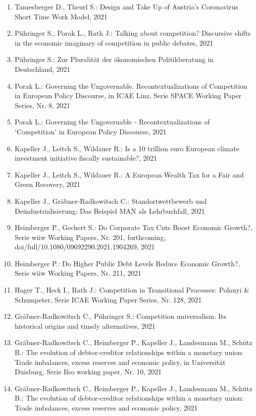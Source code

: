 \begin{enumerate}
    	 \item Tamesberger D., Theurl S.: Design and Take Up of Austria’s Coronavirus Short Time Work Model, 2021
	 \item Pühringer S., Porak L., Rath J.: Talking about competition? Discursive shifts in the economic imaginary of competition in public debates, 2021
	 \item Pühringer S.: Zur Pluralität der ökonomischen Politikberatung in Deutschland, 2021
	 \item Porak L.: Governing the Ungovernable. Recontextualizations of Competition in European Policy Discourse, in ICAE Linz, Serie SPACE Working Paper Series, Nr. 8, 2021
	 \item Porak L.: Governing the Ungovernable - Recontextualizations of ‘Competition’ in European Policy Discourse, 2021
	 \item Kapeller J., Leitch S., Wildauer R.: Is a 10 trillion euro European climate investment initiative fiscally sustainable?, 2021
	 \item Kapeller J., Leitch S., Wildauer R.: A European Wealth Tax for a Fair and Green Recovery, 2021
	 \item Kapeller J., Gräbner-Radkowitsch C.: Standortwettbewerb und Deindustrialisierung: Das Beispiel MAN als Lehrbuchfall, 2021
	 \item Heimberger P., Gechert S.: Do Corporate Tax Cuts Boost Economic Growth?, Serie wiiw Working Papers, Nr. 201, forthcoming, doi/full/10.1080/09692290.2021.1904269, 2021
	 \item Heimberger P.: Do Higher Public Debt Levels Reduce Economic Growth?, Serie wiiw Working Papers, Nr. 211, 2021
	 \item Hager T., Heck I., Rath J.: Competition in Transitional Processes: Polanyi & Schumpeter, Serie ICAE Working Paper Series, Nr. 128, 2021
	 \item Gräbner-Radkowitsch C., Pühringer S.: Competition universalism: Its historical origins and timely alternatives, 2021
	 \item Gräbner-Radkowitsch C., Heimberger P., Kapeller J., Landesmann M., Schütz B.: The evolution of debtor-creditor relationships within a monetary union: Trade imbalances, excess reserves and economic policy, in Universität Duisburg, Serie Ifso working paper, Nr. 10, 2021
	 \item Gräbner-Radkowitsch C., Heimberger P., Kapeller J., Landesmann M., Schütz B.: The evolution of debtor-creditor relationships within a monetary union: Trade imbalances, excess reserves and economic policy, 2021

\end{enumerate}

